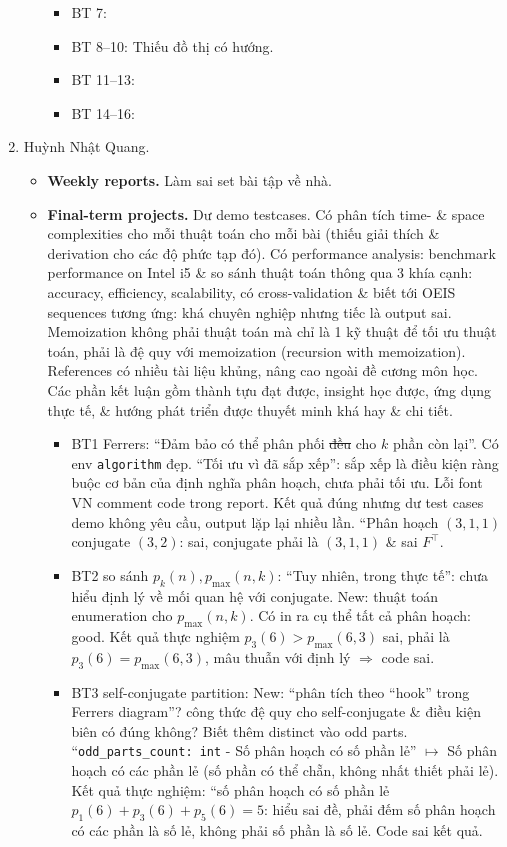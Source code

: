 \documentclass{article}
\begin{document}
\begin{enumerate}
\begin{itemize}
\begin{itemize}
            \item BT 7:
            \item BT 8--10: Thiếu đồ thị có hướng.
            \item BT 11--13:
            \item BT 14--16:
        \end{itemize}
    \end{itemize}
    \item {\sc Huỳnh Nhật Quang.}
    \begin{itemize}
        \item {\bf Weekly reports.} Làm sai set bài tập về nhà.
        \item {\bf Final-term projects.} Dư demo testcases. Có phân tích time- \& space complexities cho mỗi thuật toán cho mỗi bài (thiếu giải thích \& derivation cho các độ phức tạp đó). Có performance analysis: benchmark performance on Intel i5 \& so sánh thuật toán thông qua 3 khía cạnh: accuracy, efficiency, scalability, có cross-validation \& biết tới OEIS sequences tương ứng: khá chuyên nghiệp nhưng tiếc là output sai. Memoization không phải thuật toán mà chỉ là 1 kỹ thuật để tối ưu thuật toán, phải là đệ quy với memoization (recursion with memoization). References có nhiều tài liệu khủng, nâng cao ngoài đề cương môn học. Các phần kết luận gồm thành tựu đạt được, insight học được, ứng dụng thực tế, \& hướng phát triển được thuyết minh khá hay \& chi tiết.
        \begin{itemize}
            \item BT1 Ferrers: ``Đảm bảo có thể phân phối \st{đều} cho $k$ phần còn lại''. Có env {\tt algorithm} đẹp. ``Tối ưu vì đã sắp xếp'': sắp xếp là điều kiện ràng buộc cơ bản của định nghĩa phân hoạch, chưa phải tối ưu. Lỗi font VN comment code trong report. Kết quả đúng nhưng dư test cases demo không yêu cầu, output lặp lại nhiều lần. ``Phân hoạch $(3,1,1)$ conjugate $(3,2)$: sai, conjugate phải là $(3,1,1)$ \& sai $F^\top$.
            \item BT2 so sánh $p_k(n),p_{\max}(n,k)$: ``Tuy nhiên, trong thực tế'': chưa hiểu định lý về mối quan hệ với conjugate. New: thuật toán enumeration cho $p_{\max}(n,k)$. Có in ra cụ thể tất cả phân hoạch: good. Kết quả thực nghiệm $p_3(6) > p_{\max}(6,3)$ sai, phải là $p_3(6) = p_{\max}(6,3)$, mâu thuẫn với định lý $\Rightarrow$ code sai.
            \item BT3 self-conjugate partition: New: ``phân tích theo ``hook'' trong Ferrers diagram''? công thức đệ quy cho self-conjugate \& điều kiện biên có đúng không? Biết thêm distinct vào odd parts. ``\verb|odd_parts_count: int| - Số phân hoạch có số phần lẻ'' $\mapsto$ Số phân hoạch có các phần lẻ (số phần có thể chẵn, không nhất thiết phải lẻ). Kết quả thực nghiệm: ``số phân hoạch có số phần lẻ $p_1(6) + p_3(6) + p_5(6) = 5$: hiểu sai đề, phải đếm số phân hoạch có các phần là số lẻ, không phải số phần là số lẻ. Code sai kết quả.

\end{itemize}
\end{itemize}
\end{enumerate}
\end{document}
